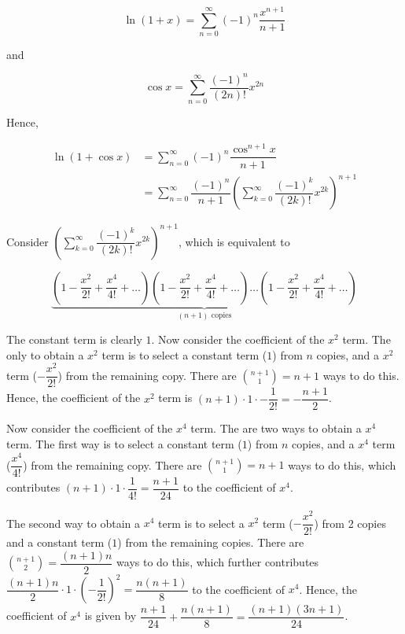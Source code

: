 \documentclass{echw}
\begin{document}
        \begin{equation*}
            \ln (1 + x) = \sum_{n=0}^\infty (-1)^n \dfrac{x^{n+1}}{n+1}
        \end{equation*}

        and 

        \begin{equation*}
            \cos x = \sum_{n=0}^\infty \dfrac{(-1)^n}{(2n)!} x^{2n}
        \end{equation*}

        Hence,

        \begin{align*}
            \ln (1 + \cos x) &= \sum_{n=0}^\infty (-1)^n \dfrac{\cos^{n+1} x}{n+1}\\
            &= \sum_{n=0}^\infty \dfrac{(-1)^n}{n+1} \left(\sum_{k=0}^\infty \dfrac{(-1)^k}{(2k)!} x^{2k} \right)^{n+1}
        \end{align*}

        Consider $\left(\sum_{k=0}^\infty \dfrac{(-1)^k}{(2k)!} x^{2k} \right)^{n+1}$, which is equivalent to

        \begin{equation*}
            \underbrace{\left(1 - \dfrac{x^2}{2!} + \dfrac{x^4}{4!} + \ldots \right)\left(1 - \dfrac{x^2}{2!} + \dfrac{x^4}{4!} + \ldots \right)\ldots\left(1 - \dfrac{x^2}{2!} + \dfrac{x^4}{4!} + \ldots \right)}_\text{$(n + 1)$ copies}
        \end{equation*}

        The constant term is clearly $1$. Now consider the coefficient of the $x^2$ term. The only to obtain a $x^2$ term is to select a constant term ($1$) from $n$ copies, and a $x^2$ term ($-\dfrac{x^2}{2!}$) from the remaining copy. There are $\displaystyle\binom{n+1}{1} = n+1$ ways to do this. Hence, the coefficient of the $x^2$ term is $(n+1) \cdot 1 \cdot -\dfrac{1}{2!} = -\dfrac{n+1}2$.

        Now consider the coefficient of the $x^4$ term. The are two ways to obtain a $x^4$ term. The first way is to select a constant term ($1$) from $n$ copies, and a $x^4$ term ($\dfrac{x^4}{4!}$) from the remaining copy. There are $\displaystyle\binom{n+1}1 = n+1$ ways to do this, which contributes $(n+1) \cdot 1 \cdot \dfrac{1}{4!} = \dfrac{n+1}{24}$ to the coefficient of $x^4$.

        The second way to obtain a $x^4$ term is to select a $x^2$ term ($-\dfrac{x^2}{2!}$) from 2 copies and a constant term ($1$) from the remaining copies. There are $\displaystyle \binom{n+1}{2} = \dfrac{(n+1)n}2$ ways to do this, which further contributes $\dfrac{(n+1)n}2 \cdot 1 \cdot \left(-\dfrac{1}{2!}\right)^2 = \dfrac{n(n+1)}8$ to the coefficient of $x^4$. Hence, the coefficient of $x^4$ is given by $\dfrac{n+1}{24} + \dfrac{n(n+1)}8 = \dfrac{(n+1)(3n + 1)}{24}$. 
\end{document}
